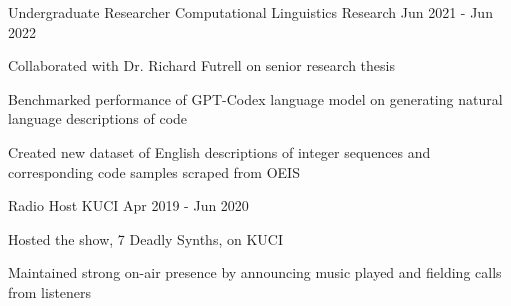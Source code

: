 
\begin{cventries}
	\cventry
	{Undergraduate Researcher}
	{Computational Linguistics Research}
	{}
	{Jun 2021 - Jun 2022}
	{\begin{cvitems}
		\item{Collaborated with Dr. Richard Futrell on senior research thesis}
		\item{Benchmarked performance of GPT-Codex language model on generating natural language descriptions of code}
        \item{Created new dataset of English descriptions of integer sequences and corresponding code samples scraped from OEIS}
	 \end{cvitems}
	}
 
	 \cventry
	 {Radio Host}
	 {KUCI}
	 {}
	 {Apr 2019 - Jun 2020}
	 {
	 	\begin{cvitems}
	 		\item {Hosted the show, 7 Deadly Synths, on KUCI}
	 		\item {Maintained strong on-air presence by announcing music played and fielding calls from listeners}
	 	\end{cvitems}
	 }
	
\end{cventries}
